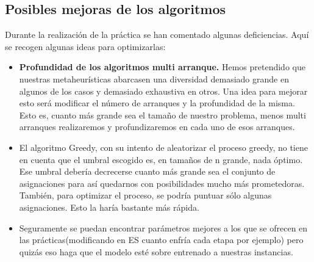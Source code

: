 \subsection{Posibles mejoras de los algoritmos}

Durante la realización de la práctica se han comentado algunas deficiencias. Aquí se recogen algunas ideas para optimizarlas:

\begin{itemize}
	\item \textbf{Profundidad de los algoritmos multi arranque.} Hemos pretendido que nuestras metaheurísticas abarcasen una diversidad demasiado grande en algunos de los casos y demasiado exhaustiva en otros. Una idea para mejorar esto será modificar el número de arranques y la profundidad de la misma. Esto es, cuanto más grande sea el tamaño de nuestro problema, menos multi arranques realizaremos y profundizaremos en cada uno de esos arranques.
	
	\item El algoritmo Greedy, con su intento de aleatorizar el proceso greedy, no tiene en cuenta que el umbral escogido es, en tamaños de n grande, nada óptimo. Ese umbral debería decrecerse cuanto más grande sea el conjunto de asignaciones para así quedarnos con posibilidades mucho más prometedoras. También, para optimizar el proceso, se podría puntuar sólo algunas asignaciones. Esto la haría bastante más rápida.
	
	\item Seguramente se puedan encontrar parámetros mejores a los que se ofrecen en las prácticas(modificando en ES cuanto enfría cada etapa por ejemplo) pero quizás eso haga que el modelo esté sobre entrenado a nuestras instancias.
	
\end{itemize}








